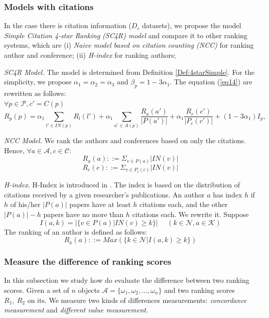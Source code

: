 \documentclass[10pt,leqno,twoside]{article}
\begin{document}
\subsubsection{Models with citations}
In the case there is citation information ($D_c$ datasets), we propose the model \textit{Simple Citation 4-star Ranking (SC4R) model} and compare it to other ranking systems, which are (i) \textit{Naive model based on citation counting (NCC)} for ranking author and conference; (ii) \textit{H-index} for ranking authors;

\textit{SC4R Model.} The model is determined from Definition \ref{Def:4starSimple}.
For the simplicity, we propose $\alpha_1=\alpha_2=\alpha_3$ and $\beta_p = 1-3\alpha_1 $.  The equation (\ref{eq14}) are rewritten as follows:\\ $\forall p\in\mathcal{P}, c' = C(p)$
\begin{equation}\label{eq16}
R_p(p) = \alpha_1\sum_{l'\in IN(p)}R_l(l') + \alpha_1\sum_{a'\in A(p)}\frac{R_a(a')}{|P(a')|} + \alpha_1\frac{R_c(c')}{|P_c(c')|} + (1-3\alpha_1)I_p,
\end{equation}


\textit{NCC Model.} We rank the authors and conferences based on only the citations.  Hence,
 $\forall a \in \mathcal{A}, c \in \mathcal{C}:$
\begin{equation}
R_a(a) ::= \Sigma_{v \in P(a)}|IN(v)|
\end{equation}
\begin{equation}
R_c(c) ::= \Sigma_{v \in P_c(c)} |IN(v)|
\end{equation}

\textit{H-index}. H-Index is introduced in \cite{HIndex06,HIndex}. The index is based on the distribution of citations received by a given researcher's publications. An author $a$ has index $h$ if $h$ of his/her $|P(a)|$ papers have at least $h$ citations each, and the other $|P(a)|-h$ papers have no more than $h$ citations each. We rewrite it.
Suppose $$I(a,k)=|\{ v \in P(a)|IN(v) \geq k\}| ~~~~~~(k \in \mathcal{N}, a \in \mathcal{K})$$ 
The ranking of an author is defined as follows:
\begin{equation}
R_a(a) ::= Max(\{k \in \mathcal{N}| I(a,k)\geq k\})
\end{equation}



\subsubsection{Measure the difference of ranking scores}
In this subsection we study how do evaluate the difference between two ranking scores. Given a set of $n$ objects $\mathcal{A} = \{\omega_1,\omega_2,\ldots,\omega_n\}$ and two ranking scores $R_1,~R_2$ on its.
We measure two kinds of differences measurements: \textit{concordance measurement} and \textit{different value measurement}.
\end{document}
